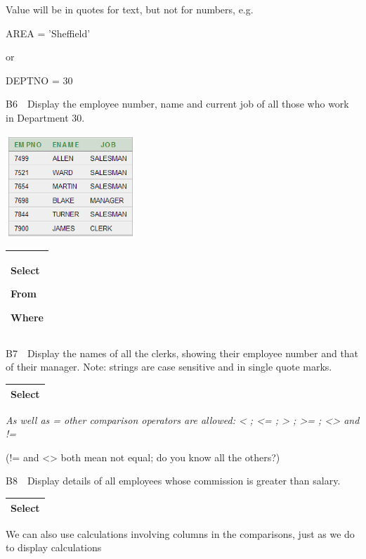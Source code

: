 Value will be in quotes for text, but not for numbers, e.g.

AREA = 'Sheffield'

or

DEPTNO = 30

B6\ \ Display the employee number, name and current job of all those who work in Department 30.

\begin{center}
  
\includegraphics[width=4.9cm,height=3.861cm]{images/img (25).png}

\end{center}
\begin{flushleft}
\tablefirsthead{}
\tablehead{}
\tabletail{}
\tablelasttail{}
\begin{supertabular}{|m{9.202001cm}|}
\hline
Select 

From

Where\\\hline
\end{supertabular}
\end{flushleft}
B7\ \ Display the names of all the clerks, showing their employee number and that of their manager.  Note: strings are case sensitive and in single quote marks.

\begin{flushleft}
\tablefirsthead{}
\tablehead{}
\tabletail{}
\tablelasttail{}
\begin{supertabular}{|m{14.303cm}|}
\hline
Select 

\\\hline
\end{supertabular}
\end{flushleft}
\emph{As well as = other comparison operators are allowed: {\textless} ; {\textless}= ; {\textgreater} ;  {\textgreater}= ; {\textless}{\textgreater} and !=}

(!= and {\textless}{\textgreater} both mean not equal; do you know all the others?)

B8\ \ Display details of all employees whose commission is greater than salary.

\begin{flushleft}
\tablefirsthead{}
\tablehead{}
\tabletail{}
\tablelasttail{}
\begin{supertabular}{|m{14.303cm}|}
\hline
Select 

\\\hline
\end{supertabular}
\end{flushleft}
We can also use calculations involving columns in the comparisons, just as we do to display calculations

